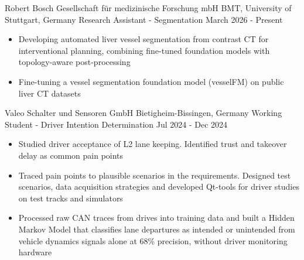 \documentclass{bmsnkresume}
\begin{document}
\newcommand{\columnsectiontitle}[1]{%
  {\cvemphsize\color{darktext}\MakeUppercase{#1}}\par
  \noindent{\color{lighttext}\rule{\linewidth}{0.2pt}}%
  \vspace{0.2em}%
}

\newenvironment{academicsitems}{\begin{itemize}}{\end{itemize}}


\makeheader


\experience
  {Robert  Bosch  Gesellschaft  für  medizinische  Forschung  mbH}
  {BMT, University of Stuttgart, Germany}
  {Research Assistant - Segmentation}
  {March 2026 - Present}
\begin{itemize}
  \item Developing automated liver vessel segmentation from contrast CT for interventional planning, combining fine-tuned foundation models with topology-aware post-processing
  \item Fine-tuning a vessel segmentation foundation model (vesselFM) on public liver CT datasets
\end{itemize}
\vspace{-0.6em}

\experience
  {Valeo Schalter und Sensoren GmbH}
  {Bietigheim-Bissingen, Germany}
  {Working Student - Driver Intention Determination}
  {Jul 2024 - Dec 2024}
\begin{itemize}
  \item Studied driver acceptance of L2 lane keeping. Identified trust and takeover delay as common pain points 
  \item Traced pain points to plausible scenarios in the requirements. Designed test scenarios, data acquisition strategies and developed Qt-tools for driver studies on test tracks and simulators
  \item Processed raw CAN traces from drives into training data and built a Hidden Markov Model that classifies lane departures as intended or unintended from vehicle dynamics signals alone at 68\% precision, without driver monitoring hardware
\end{itemize}
\vspace{-0.6em}
\end{document}
